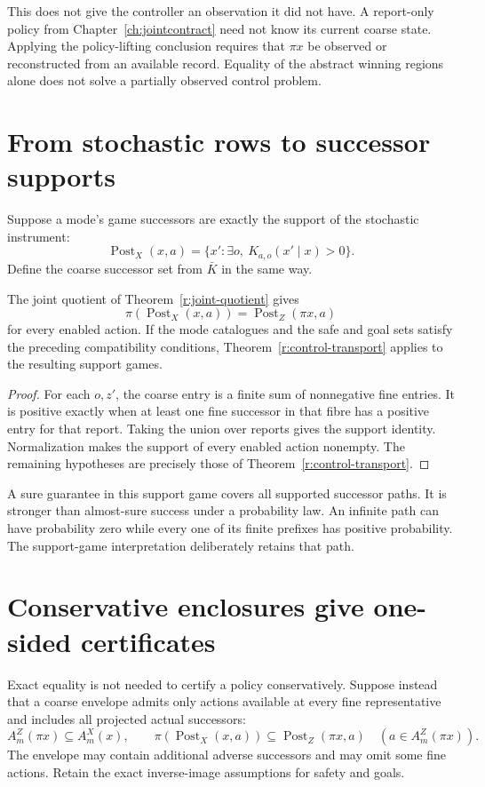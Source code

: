 This does not give the controller an observation it did not have. A report-only policy from Chapter~\ref{ch:jointcontract} need not know its current coarse state. Applying the policy-lifting conclusion requires that $\pi x$ be observed or reconstructed from an available record. Equality of the abstract winning regions alone does not solve a partially observed control problem.

\section{From stochastic rows to successor supports}
Suppose a mode's game successors are exactly the support of the stochastic instrument:
\[
 \operatorname{Post}_X(x,a)
 =\{x':\exists o,\ K_{a,o}(x'\mid x)>0\}.
\]
Define the coarse successor set from $\bar K$ in the same way.

\begin{corollary}\label{r:stochastic-support-game}
The joint quotient of Theorem~\ref{r:joint-quotient} gives
\[
 \pi(\operatorname{Post}_X(x,a))=\operatorname{Post}_Z(\pi x,a)
\]
for every enabled action. If the mode catalogues and the safe and goal sets satisfy the preceding compatibility conditions, Theorem~\ref{r:control-transport} applies to the resulting support games.
\end{corollary}
\begin{proof}
For each $o,z'$, the coarse entry is a finite sum of nonnegative fine entries. It is positive exactly when at least one fine successor in that fibre has a positive entry for that report. Taking the union over reports gives the support identity. Normalization makes the support of every enabled action nonempty. The remaining hypotheses are precisely those of Theorem~\ref{r:control-transport}.
\end{proof}

A sure guarantee in this support game covers all supported successor paths. It is stronger than almost-sure success under a probability law. An infinite path can have probability zero while every one of its finite prefixes has positive probability. The support-game interpretation deliberately retains that path.

\section{Conservative enclosures give one-sided certificates}
Exact equality is not needed to certify a policy conservatively. Suppose instead that a coarse envelope admits only actions available at every fine representative and includes all projected actual successors:
\[
 A^Z_m(\pi x)\subseteq A^X_m(x),\qquad
 \pi(\operatorname{Post}_X(x,a))
 \subseteq\operatorname{Post}_Z(\pi x,a)
 \quad(a\in A^Z_m(\pi x)).
\]
The envelope may contain additional adverse successors and may omit some fine actions. Retain the exact inverse-image assumptions for safety and goals.

